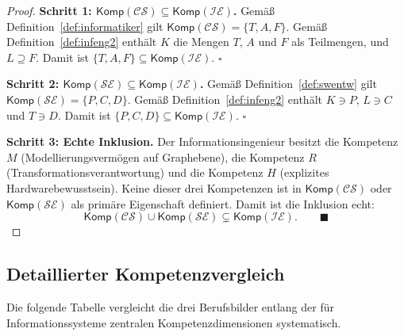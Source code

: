 ﻿\documentclass[a4paper,12pt]{report}
\theoremstyle{definition}
\begin{document}
\begin{proof}
\textbf{Schritt 1: $\mathsf{Komp}(\mathcal{CS}) \subseteq \mathsf{Komp}(\mathcal{IE})$.}
Gemäß Definition~\ref{def:informatiker} gilt
$\mathsf{Komp}(\mathcal{CS}) = \{T, A, F\}$.
Gemäß Definition~\ref{def:infeng2} enthält $K$ die Mengen $T$, $A$ und $F$ als Teilmengen,
und $L \supseteq F$. Damit ist $\{T, A, F\} \subseteq \mathsf{Komp}(\mathcal{IE})$. $\square$

\textbf{Schritt 2: $\mathsf{Komp}(\mathcal{SE}) \subseteq \mathsf{Komp}(\mathcal{IE})$.}
Gemäß Definition~\ref{def:swentw} gilt
$\mathsf{Komp}(\mathcal{SE}) = \{P, C, D\}$.
Gemäß Definition~\ref{def:infeng2} enthält $K \ni P$, $L \ni C$ und $T \ni D$.
Damit ist $\{P, C, D\} \subseteq \mathsf{Komp}(\mathcal{IE})$. $\square$

\textbf{Schritt 3: Echte Inklusion.}
Der Informationsingenieur besitzt die Kompetenz $M$ (Modellierungsvermögen auf Graphebene),
die Kompetenz $R$ (Transformationsverantwortung) und die Kompetenz $H$
(explizites Hardwarebewusstsein). Keine dieser drei Kompetenzen ist in
$\mathsf{Komp}(\mathcal{CS})$ oder $\mathsf{Komp}(\mathcal{SE})$ als primäre Eigenschaft
definiert. Damit ist die Inklusion echt:
\[
  \mathsf{Komp}(\mathcal{CS}) \cup \mathsf{Komp}(\mathcal{SE}) \subsetneq \mathsf{Komp}(\mathcal{IE}).
  \qquad \blacksquare
\]
\end{proof}

\subsection{Detaillierter Kompetenzvergleich}

Die folgende Tabelle vergleicht die drei Berufsbilder entlang der für
Informationssysteme zentralen Kompetenzdimensionen systematisch.
\end{document}
